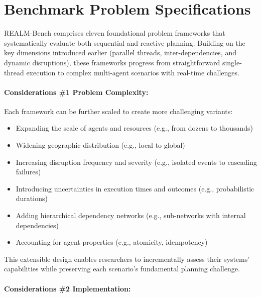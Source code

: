 \section{Benchmark Problem Specifications}




REALM-Bench comprises eleven foundational problem frameworks that systematically evaluate both sequential and reactive planning. Building on the key dimensions introduced earlier (parallel threads, inter-dependencies, and dynamic disruptions), these frameworks progress from straightforward single-thread execution to complex multi-agent scenarios with real-time challenges.

\paragraph{\textbf{Considerations \#1 Problem Complexity:}} 

Each framework can be further scaled to create more challenging variants:
\begin{itemize}[leftmargin=1.0em, topsep=-.0em, parsep=-.0em, label=*]
\item Expanding the scale of agents and resources (e.g., from dozens to thousands)
\item Widening geographic distribution (e.g., local to global)
\item Increasing disruption frequency and severity (e.g., isolated events to cascading failures)
\item Introducing uncertainties in execution times and outcomes (e.g., probabilistic durations)
\item Adding hierarchical dependency networks (e.g., sub-networks with internal dependencies)
\item Accounting for agent properties (e.g., atomicity, idempotency)
\end{itemize}
\vspace{.1in}
This extensible design enables researchers to incrementally assess their systems’ capabilities while preserving each scenario’s fundamental planning challenge.

\paragraph{\textbf{Considerations \#2 Implementation:}}

